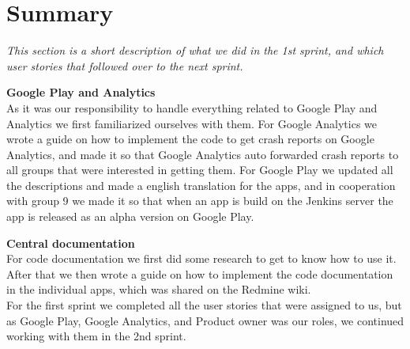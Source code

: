 \section{Summary} 
\textit{This section is a short description of what we did in the 1st sprint, and which user stories that followed over to the next sprint.}

\textbf{Google Play and Analytics}\\
As it was our responsibility to handle everything related to Google Play and Analytics we first familiarized ourselves with them. For Google Analytics we wrote a guide on how to implement the code to get crash reports on Google Analytics, and made it so that Google Analytics auto forwarded crash reports to all groups that were interested in getting them. For Google Play we updated all the descriptions and made a english translation for the apps, and in cooperation with group 9 we made it so that when an app is build on the Jenkins server the app is released as an alpha version on Google Play.

\textbf{Central documentation}\\
For code documentation we first did some research to get to know how to use it. After that we then wrote a guide on how to implement the code documentation in the individual apps, which was shared on the Redmine wiki.\\

For the first sprint we completed all the user stories that were assigned to us, but as Google Play, Google Analytics, and Product owner was our roles, we continued working with them in the 2nd sprint.